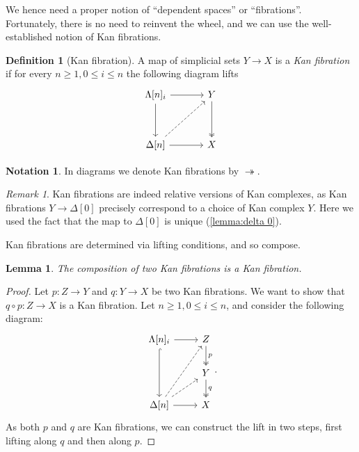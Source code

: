 \documentclass[11pt, a4paper]{amsart}
\newtheorem{lemma}[equation]{Lemma}
\theoremstyle{definition}
\newtheorem{definition}[equation]{Definition}
\newtheorem{notation}[equation]{Notation}
\theoremstyle{remark}
\newtheorem{remark}[equation]{Remark}
\numberwithin{equation}{section}
\begin{document}
We hence need a proper notion of ``dependent spaces'' or ``fibrations''. Fortunately, there is no need to reinvent the wheel, and we can use the well-established notion of Kan fibrations.

\begin{definition}[Kan fibration]
  A map of simplicial sets $Y \to X$ is a \emph{Kan fibration} if for every $n \geq 1, 0 \leq i \leq n$ the following diagram lifts
  \[
    \begin{tikzcd}[row sep=1.2cm, column sep=1.2cm]
     \Lambda[n]_i  \arrow[r] \arrow[d] & Y \arrow[d, twoheadrightarrow] \\
     \Delta[n] \arrow[ur, dashed] \arrow[r] & X
    \end{tikzcd}
  \]
\end{definition}

\begin{notation}
  In diagrams we denote Kan fibrations by $\twoheadrightarrow$.
\end{notation}

\begin{remark} \label{rem:kan fibration kan complex}
  Kan fibrations are indeed relative versions of Kan complexes, as Kan fibrations $Y \to \Delta[0]$ precisely correspond to a choice of Kan complex $Y$. Here we used the fact that the map to $\Delta[0]$ is unique (\cref{lemma:delta 0}).
\end{remark}

Kan fibrations are determined via lifting conditions, and so compose.

\begin{lemma} \label{lemma:kan fibration compose}
  The composition of two Kan fibrations is a Kan fibration.
\end{lemma}

\begin{proof}
 Let $p\colon Z \to Y$ and $q\colon Y \to X$ be two Kan fibrations. We want to show that $q \circ p\colon Z \to X$ is a Kan fibration. Let $n \geq 1, 0 \leq i \leq n$, and consider the following diagram:
  \[
    \begin{tikzcd}
     \Lambda[n]_i  \arrow[r] \arrow[dd, hookrightarrow] & Z \arrow[d, "p", twoheadrightarrow] \\
      & Y \arrow[d, "q", twoheadrightarrow] \\
     \Delta[n] \arrow[ur, dashed] \arrow[uur, dashed] \arrow[r] & X
    \end{tikzcd}.
  \]
  As both $p$ and $q$ are Kan fibrations, we can construct the lift in two steps, first lifting along $q$ and then along $p$.
\end{proof}
\end{document}
